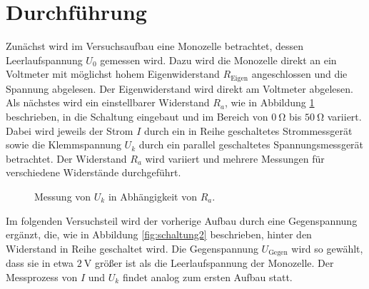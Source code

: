 \section{Durchführung}
\label{sec:Durchführung}

Zunächst wird im Versuchsaufbau eine Monozelle betrachtet, dessen Leerlaufspannung $U_0$ gemessen wird.
Dazu wird die Monozelle direkt an ein Voltmeter mit möglichst hohem Eigenwiderstand $R_{\text{Eigen}}$ angeschlossen und die Spannung abgelesen.
Der Eigenwiderstand wird direkt am Voltmeter abgelesen. \\
Als nächstes wird ein einstellbarer Widerstand $R_a$, wie in Abbildung \ref{fig:schaltung1} beschrieben, in die Schaltung eingebaut und im Bereich von $\SI{0}{\ohm}$ bis $\SI{50}{\ohm}$ variiert.
Dabei wird jeweils der Strom $I$ durch ein in Reihe geschaltetes Strommessgerät sowie die Klemmspannung $U_k$ durch ein parallel geschaltetes Spannungsmessgerät betrachtet.
Der Widerstand $R_a$ wird variiert und mehrere Messungen für verschiedene Widerstände durchgeführt.

\begin{figure}[H]
  \centering
    \caption{Messung von $U_k$ in Abhängigkeit von $R_a$.}
    \label{fig:schaltung1}
\end{figure}

Im folgenden Versuchsteil wird der vorherige Aufbau durch eine Gegenspannung ergänzt, die, wie in Abbildung \ref{fig:schaltung2} beschrieben, hinter den Widerstand in Reihe geschaltet wird.
Die Gegenspannung $U_{\text{Gegen}}$ wird so gewählt, dass sie in etwa $\SI{2}{\volt}$ größer ist als die Leerlaufspannung der Monozelle.
Der Messprozess von $I$ und $U_k$ findet analog zum ersten Aufbau statt.


\tikzset{circuit declare symbol = DC source}

